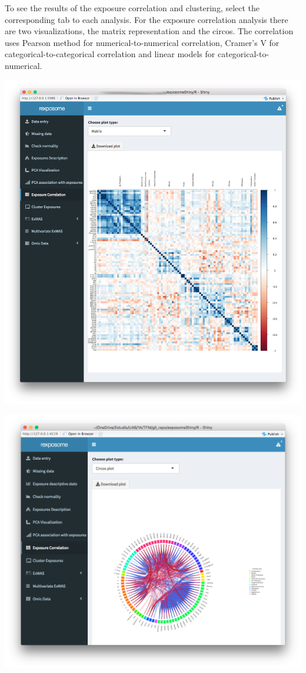 \documentclass[
]{book}
\begin{document}
To see the results of the exposure correlation and clustering, select the corresponding tab to each analysis. For the exposure correlation analysis there are two visualizations, the matrix representation and the circos. The correlation uses Pearson method for numerical-to-numerical correlation, Cramer's V for categorical-to-categorical correlation and linear models for categorical-to-numerical.

\includegraphics{images/analysis6_2.png}

\includegraphics{images/analysis6_3.png}
\end{document}
